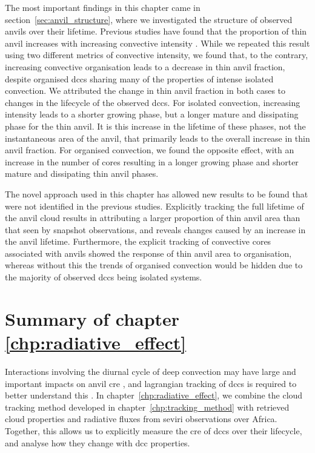 The most important findings in this chapter came in section~\ref{sec:anvil_structure}, where we investigated the structure of observed anvils over their lifetime.
Previous studies have found that the proportion of thin anvil increases with increasing convective intensity \citep{protopapadaki_upper_2017, takahashi_relationships_2017}.
While we repeated this result using two different metrics of convective intensity, we found that, to the contrary, increasing convective organisation leads to a decrease in thin anvil fraction, despite organised \acrshort{dcc}s sharing many of the properties of intense isolated convection.
We attributed the change in thin anvil fraction in both cases to changes in the lifecycle of the observed \acrshort{dcc}s.
For isolated convection, increasing intensity leads to a shorter growing phase, but a longer mature and dissipating phase for the thin anvil.
It is this increase in the lifetime of these phases, not the instantaneous area of the anvil, that primarily leads to the overall increase in thin anvil fraction.
For organised convection, we found the opposite effect, with an increase in the number of cores resulting in a longer growing phase and shorter mature and dissipating thin anvil phases.

The novel approach used in this chapter has allowed new results to be found that were not identified in the previous studies.
Explicitly tracking the full lifetime of the anvil cloud results in attributing a larger proportion of thin anvil area than that seen by snapshot observations, and reveals changes caused by an increase in the anvil lifetime.
Furthermore, the explicit tracking of convective cores associated with anvils showed the response of thin anvil area to organisation, whereas without this the trends of organised convection would be hidden due to the majority of observed \acrshort{dcc}s being isolated systems.




\section{Summary of chapter \ref{chp:radiative_effect}}

Interactions involving the diurnal cycle of deep convection may have large and important impacts on anvil \acrshort{cre} \citep{nowicki_observations_2004}, and lagrangian tracking of \acrshort{dcc}s is required to better understand this \citep{bouniol_macrophysical_2016}.
In chapter~\ref{chp:radiative_effect}, we combine the cloud tracking method developed in chapter~\ref{chp:tracking_method} with retrieved cloud properties and radiative fluxes from \acrshort{seviri} observations over Africa. 
Together, this allows us to explicitly measure the \acrshort{cre} of \acrshort{dcc}s over their lifecycle, and analyse how they change with \acrshort{dcc} properties.

